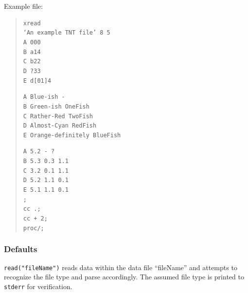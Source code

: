\begin{description}
		  Example file:
		  	\begin{quote}
			  	\texttt{xread\\
				  	`An example TNT file' 8 5\\
				  	A 000\\
				  	B a14\\
				  	C b22\\
				  	D ?33\\
				  	E d[01]4\\}
			  	
			  	\texttt{A Blue-ish -\\
				  	B Green-ish OneFish\\
				  	C Rather-Red TwoFish\\
				  	D Almost-Cyan RedFish\\
				  	E Orange-definitely BlueFish\\}
					
				\texttt{A 5.2 - ?\\
					 B 5.3 0.3 1.1\\
					 C 3.2 0.1 1.1\\
					 D 5.2 1.1 0.1\\
					 E 5.1 1.1 0.1\\
				  	;\\
				  	cc .;\\
				  	cc + 2;\\
				  	proc/;\\}
			  \end{quote}
	\end{description}	
		
	\subsubsection{Defaults}
		\texttt{read("fileName")} reads data within the data file ``fileName'' and attempts to recognize the 
		file type and parse accordingly. The assumed file type is printed to \texttt{stderr} for 
		verification.
		
